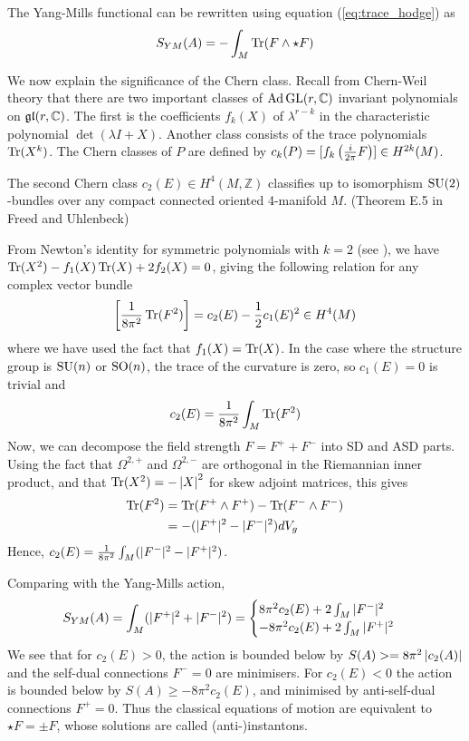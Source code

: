 The Yang-Mills functional can be rewritten using equation (\ref{eq:trace_hodge}) as
\[
	S_{YM}(A) = -\int_M \operatorname{Tr} (F\wedge \star F) 
\] 

We now explain the significance of the Chern class.
Recall from Chern-Weil theory that there are two important classes of
$\operatorname{Ad} \operatorname{GL}(r,\mathbb{C})$ invariant polynomials on $\operatorname{\mathfrak{gl}}(r,\mathbb{C})$. 
The first is the coefficients $f_k(X)$ of $\lambda^{r-k}$ in the characteristic
polynomial $\det(\lambda I + X)$. Another class consists of the trace
polynomials $\operatorname{Tr}(X^k)$. 
The Chern classes of $P$ are defined by $c_k(P) =
[f_k\paren{\frac{i}{2\pi}F}] \in H^{2k}(M)$. 
\begin{thm}
	The second Chern class $c_2(E)\in H^4(M,\mathbb{Z})$ classifies up to
	isomorphism $\operatorname{SU}(2)$-bundles over any compact connected oriented 4-manifold
	 $M$. (Theorem E.5 in Freed and Uhlenbeck)
\end{thm}

From Newton's identity for symmetric polynomials with $k=2$ 
(see \cite[Theorem B.2]{loringtu}), we have $\operatorname{Tr}(X^2)-f_1(X)\operatorname{Tr}(X)+2f_2(X)=0$, 
giving the following relation for any complex vector bundle
\[ %
	\bracket{\frac{1}{8\pi^2} \Tr(F^2)} = c_2(E) - \frac{1}{2}c_1(E)^2 \in H^4(M)
\] 
where we have used the fact that $f_1(X)=\operatorname{Tr}(X)$. 
In the case where the structure group is $\operatorname{SU}(n)$ or $\operatorname{SO}(n)$, the trace of the
curvature is zero, so $c_1(E)=0$ is trivial and 
\[
c_2(E) = \frac{1}{8\pi^2}\int_M \operatorname{Tr}(F^2)
\] 
Now, we can
decompose the field strength $F = F^+ + F^-$ into SD and ASD 
parts. Using the fact that $\Omega^{2,+}$ and $\Omega^{2,-}$ are orthogonal in
the Riemannian inner product, and
that $\Tr(X^2) = -\abs{X}^2$ for skew adjoint matrices, this 
gives 
\begin{align*}
\Tr(F^2) 
&= \Tr(F^{+}\wedge  F^{+}) - \Tr(F^{-}\wedge F^{-}) \\
&= - (\abs[*]{F^+}^2 - \abs[*]{F^-}^2) dV_g 
\end{align*}
Hence, $c_2(E) = \frac{1}{8\pi^2}\int_M
(\abs[*]{F^-}^2-\abs[*]{F^+}^2)$. 

Comparing with the Yang-Mills action, 
\begin{align*}
	S_{YM}(A) = \int_M (\abs[*]{F^+}^2+\abs[*]{F^-}^2) 
	= \begin{cases}
		8\pi^2 c_2(E) + 2\int_M \abs[*]{F^-}^2 \\
		-8\pi^2 c_2(E) + 2\int_M \abs[*]{F^+}^2
	\end{cases}
\end{align*}
We see that for $c_2(E)>0$, the action is bounded below by 
$S(A) >= 8\pi^2\abs{c_2(A)}$ and the self-dual connections $F^-=0$ are
minimisers. For $c_2(E)<0$ the action is bounded
below by $S(A)\geq -8\pi^2c_2(E)$, and minimised by anti-self-dual connections
$F^+=0$. 
Thus the classical equations of motion are equivalent to $\star F = \pm F$,
whose solutions are called (anti-)instantons. 

